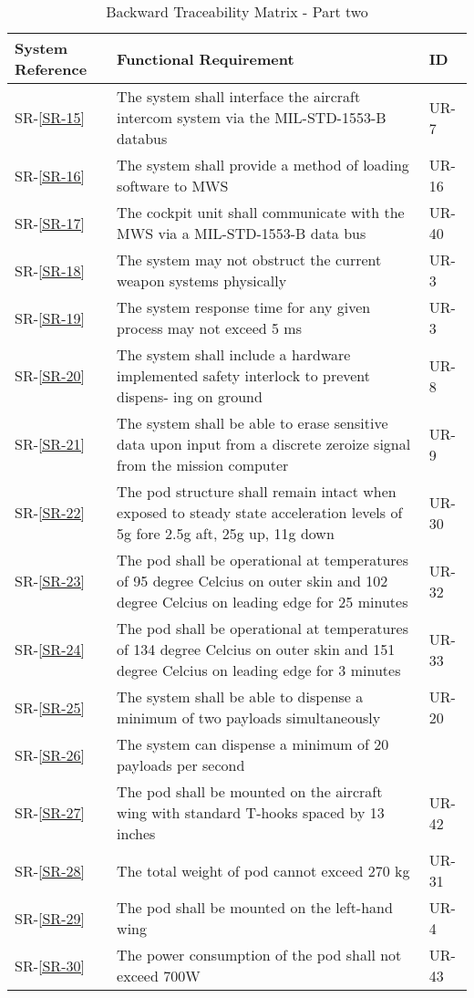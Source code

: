 \documentclass[Main]{subfiles}
\begin{document}
\begin{table}[htbp]
	\centering
	\begin{tabular}{p{1.8cm} p{11cm} l} \hline
	System Reference & Functional Requirement & ID\\\hline
	SR-\ref{SR-15} & The system shall interface the aircraft intercom system via the MIL-STD-1553-B
	databus & UR-7 \\
	SR-\ref{SR-16} & The system shall provide a method of loading software to MWS & UR-16 \\
	SR-\ref{SR-17} & The cockpit unit shall communicate with the MWS via a MIL-STD-1553-B data bus & UR-40 \\
	SR-\ref{SR-18} & The system may not obstruct the current weapon systems physically & UR-3 \\
	SR-\ref{SR-19} & The system response time for any given process may not exceed 5 ms & UR-3 \\
	SR-\ref{SR-20} & The system shall include a hardware implemented safety interlock to prevent dispens-
	ing on ground & UR-8 \\
	SR-\ref{SR-21} & The system shall be able to erase sensitive data upon input from a discrete zeroize
	signal from the mission computer & UR-9 \\
	SR-\ref{SR-22} &  The pod structure shall remain intact when exposed to steady state acceleration levels
	of 5g fore 2.5g aft, 25g up, 11g down & UR-30 \\
	SR-\ref{SR-23} &  The pod shall be operational at temperatures of 95 degree Celcius on outer skin and
	102 degree Celcius on leading edge for 25 minutes & UR-32 \\
	SR-\ref{SR-24} &  The pod shall be operational at temperatures of 134 degree Celcius on outer skin and
	151 degree Celcius on leading edge for 3 minutes & UR-33 \\
	SR-\ref{SR-25} & The system shall be able to dispense a minimum of two payloads simultaneously  & UR-20 \\
	SR-\ref{SR-26} & The system can dispense a minimum of 20 payloads per second &  \\
	SR-\ref{SR-27} & The pod shall be mounted on the aircraft wing with standard T-hooks spaced by 13
	inches & UR-42 \\
	SR-\ref{SR-28} & The total weight of pod cannot exceed 270 kg  & UR-31 \\
	SR-\ref{SR-29} & The pod shall be mounted on the left-hand wing & UR-4 \\
	SR-\ref{SR-30} & The power consumption of the pod shall not exceed 700W & UR-43 \\\hline
	\end{tabular}

\caption{Backward Traceability Matrix - Part two}
\label{Tab:BackwardPartTwo}
\end{table}
\end{document}
